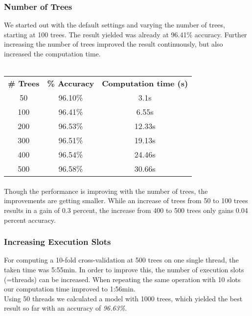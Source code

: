 \documentclass{article}
\begin{document}
\subsubsection{Number of Trees} We started out with the default settings and varying the number of trees, starting at 100 trees. The result yielded was already at 96.41\% accuracy. Further increasing the number of trees improved the result continuously, but also increased the computation time. 
\\\\
\begin{center}
\begin{tabular}{ c | c | c }
\textbf{\# Trees} & \textbf{\% Accuracy} & \textbf{Computation time (s)} \\
50 & 96.10\% & 3.1s \\
100 & 96.41\% & 6.55s \\
200 & 96.53\% & 12.33s \\
300 & 96.51\% & 19.13s \\
400 & 96.54\% & 24.46s \\
500 & 96.58\% & 30.66s\\
\end{tabular}
\end{center}


\paragraph{}Though the performance is improving with the number of trees, the improvements are getting smaller. While an increase of trees from 50 to 100 trees results in a gain of 0.3 percent, the increase from 400 to 500 trees only gains 0.04 percent accuracy. 
\subsubsection{Increasing Execution Slots}For computing a 10-fold cross-validation at 500 trees on one single thread, the taken time was 5:55min. In order to improve this, the number of execution slots (=threads) can be increased. When repeating the same operation with 10 slots our computation time improved to 1:56min. \\
Using 50 threads we calculated a model with 1000 trees, which yielded the best result so far with an accuracy of \emph{96.63\%}. 
\end{document}

